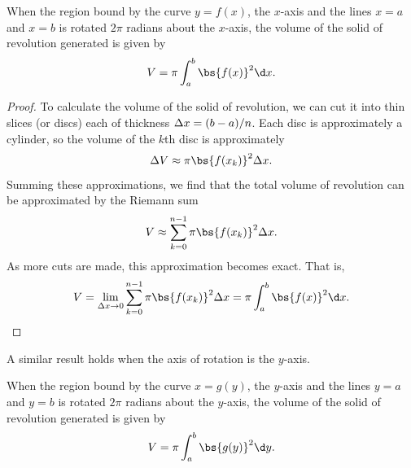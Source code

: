 \begin{proposition}
    When the region bound by the curve $y = f(x)$, the $x$-axis and the lines $x = a$ and $x = b$ is rotated $2\pi$ radians about the $x$-axis, the volume of the solid of revolution generated is given by \[V = \pi \int_a^b \bs{f(x)}^2 \d x.\]
\end{proposition}
\begin{figure}[H]
    \centering
    \caption{}
\end{figure}
\begin{proof}
    To calculate the volume of the solid of revolution, we can cut it into thin slices (or discs) each of thickness $\Delta x = (b-a)/n$. Each disc is approximately a cylinder, so the volume of the $k$th disc is approximately \[\D V \approx \pi \bs{f(x_k)}^2 \D x.\] Summing these approximations, we find that the total volume of revolution can be approximated by the Riemann sum \[V \approx \sum_{k = 0}^{n-1} \pi \bs{f(x_k)}^2 \D x.\] As more cuts are made, this approximation becomes exact. That is, \[V = \lim_{\D x \to 0} \sum_{k = 0}^{n-1} \pi \bs{f(x_k)}^2 \D x = \pi \int_a^b \bs{f(x)}^2 \d x.\]
\end{proof}

A similar result holds when the axis of rotation is the $y$-axis.

\begin{proposition}
    When the region bound by the curve $x = g(y)$, the $y$-axis and the lines $y = a$ and $y = b$ is rotated $2\pi$ radians about the $y$-axis, the volume of the solid of revolution generated is given by \[V = \pi \int_a^b \bs{g(y)}^2 \d y.\]
\end{proposition}

